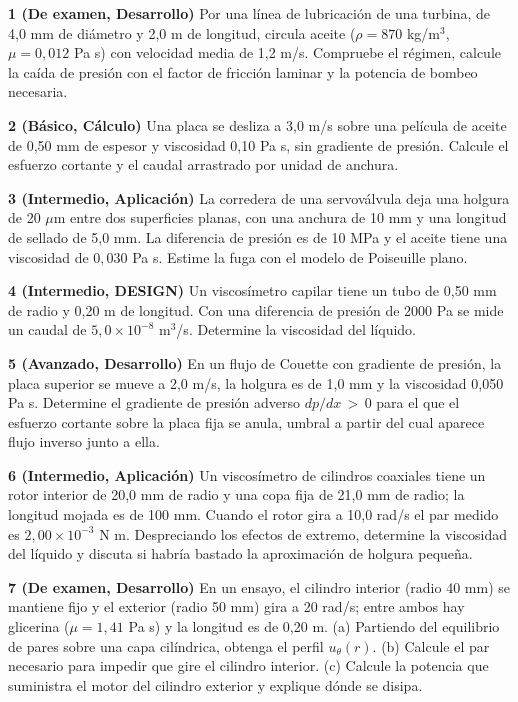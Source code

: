 \documentclass[10pt,openany]{book}
\begin{document}
\begin{tcolorbox}[title={Ejercicios propuestos}, studiumworked, breakable]

\noindent\textbf{1 (De examen, Desarrollo)}
Por una línea de lubricación de una turbina, de 4,0 mm de diámetro y 2,0 m de longitud, circula aceite (\(\rho = 870\) kg/m\(^3\), \(\mu = 0{,}012\) Pa s) con velocidad media de 1,2 m/s. Compruebe el régimen, calcule la caída de presión con el factor de fricción laminar y la potencia de bombeo necesaria.

\noindent\textbf{2 (Básico, Cálculo)}
Una placa se desliza a 3,0 m/s sobre una película de aceite de 0,50 mm de espesor y viscosidad 0,10 Pa s, sin gradiente de presión. Calcule el esfuerzo cortante y el caudal arrastrado por unidad de anchura.

\noindent\textbf{3 (Intermedio, Aplicación)}
La corredera de una servoválvula deja una holgura de 20 \(\mu\)m entre dos superficies planas, con una anchura de 10 mm y una longitud de sellado de 5,0 mm. La diferencia de presión es de 10 MPa y el aceite tiene una viscosidad de \(0{,}030\) Pa s. Estime la fuga con el modelo de Poiseuille plano.

\noindent\textbf{4 (Intermedio, DESIGN)}
Un viscosímetro capilar tiene un tubo de 0,50 mm de radio y 0,20 m de longitud. Con una diferencia de presión de 2000 Pa se mide un caudal de \(5{,}0\times 10^{-8}\) m\(^3\)/s. Determine la viscosidad del líquido.

\noindent\textbf{5 (Avanzado, Desarrollo)}
En un flujo de Couette con gradiente de presión, la placa superior se mueve a 2,0 m/s, la holgura es de 1,0 mm y la viscosidad 0,050 Pa s. Determine el gradiente de presión adverso \(dp/dx\,>\,0\) para el que el esfuerzo cortante sobre la placa fija se anula, umbral a partir del cual aparece flujo inverso junto a ella.

\noindent\textbf{6 (Intermedio, Aplicación)}
Un viscosímetro de cilindros coaxiales tiene un rotor interior de 20,0 mm de radio y una copa fija de 21,0 mm de radio; la longitud mojada es de 100 mm. Cuando el rotor gira a 10,0 rad/s el par medido es \(2{,}00\times 10^{-3}\) N m. Despreciando los efectos de extremo, determine la viscosidad del líquido y discuta si habría bastado la aproximación de holgura pequeña.

\noindent\textbf{7 (De examen, Desarrollo)}
En un ensayo, el cilindro interior (radio 40 mm) se mantiene fijo y el exterior (radio 50 mm) gira a 20 rad/s; entre ambos hay glicerina (\(\mu = 1{,}41\) Pa s) y la longitud es de 0,20 m. (a) Partiendo del equilibrio de pares sobre una capa cilíndrica, obtenga el perfil \(u_\theta(r)\). (b) Calcule el par necesario para impedir que gire el cilindro interior. (c) Calcule la potencia que suministra el motor del cilindro exterior y explique dónde se disipa.


\end{tcolorbox}
\end{document}
